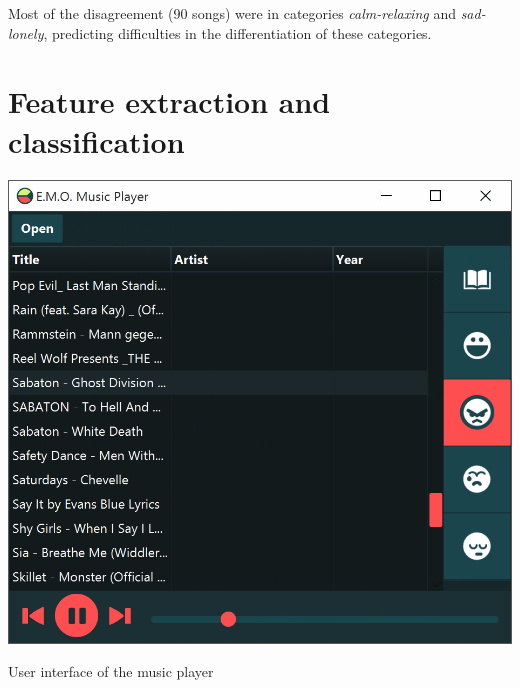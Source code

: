 \documentclass{sigchi-ext}
\begin{document}
Most of the disagreement (90 songs) were in categories \textit{calm-relaxing} and \textit{sad-lonely}, predicting difficulties in the differentiation of these categories.\\

\section{Feature extraction and classification}\label{sec:feature-extraction}

\begin{marginfigure}[0pc]
  \begin{minipage}{\marginparwidth}
    \centering
    \includegraphics[width=1.0\marginparwidth]{images/screenshot.png}
  	\caption{User interface of the music player}~\label{fig:screenshot}
  \end{minipage}
\end{marginfigure}
\end{document}
